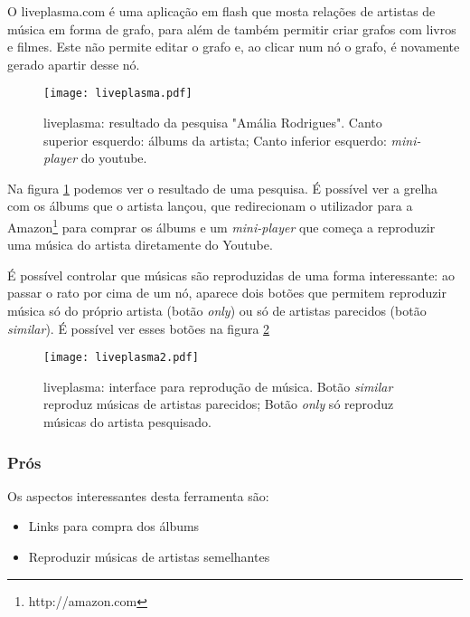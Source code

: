 O liveplasma.com é uma aplicação em flash que mosta relações de artistas de música em forma de grafo, para além de também permitir criar grafos com livros e filmes.
Este não permite editar o grafo e, ao clicar num nó o grafo, é novamente gerado apartir desse nó.

\begin{figure}[tb]
  \begin{center}
    \texttt{[image: liveplasma.pdf]}
  \end{center}
  \caption{liveplasma: resultado da pesquisa "Amália Rodrigues". Canto superior esquerdo: álbums da artista; Canto inferior esquerdo: \emph{mini-player} do youtube.}
  \label{fig:sota_liveplasma}
\end{figure}

Na figura \ref{fig:sota_liveplasma} podemos ver o resultado de uma pesquisa.
É possível ver a grelha com os álbums que o artista lançou, que redirecionam o utilizador para a Amazon\footnote{http://amazon.com} para comprar os álbums e um \emph{mini-player} que começa a reproduzir uma música do artista diretamente do Youtube.

É possível controlar que músicas são reproduzidas de uma forma interessante: ao passar o rato por cima de um nó, aparece dois botões que permitem reproduzir música só do próprio artista (botão \emph{only}) ou só de artistas parecidos (botão \emph{similar}).
É possível ver esses botões na figura \ref{fig:sota_liveplasma2}

\begin{figure}[tb]
  \begin{center}
    \texttt{[image: liveplasma2.pdf]}
  \end{center}
  \caption{liveplasma: interface para reprodução de música. Botão \emph{similar} reproduz músicas de artistas parecidos; Botão \emph{only} só reproduz músicas do artista pesquisado.}
  \label{fig:sota_liveplasma2}
\end{figure}

\subsubsection{Prós} %
\label{ssub:liveplasma_pros}

Os aspectos interessantes desta ferramenta são:

\begin{itemize}
  \item Links para compra dos álbums
  \item Reproduzir músicas de artistas semelhantes
\end{itemize}

